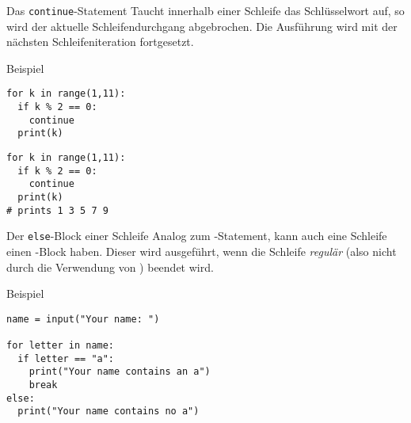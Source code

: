 \begin{fragile}
	

\begin{block}{Das \texttt{continue}-Statement}
Taucht innerhalb einer Schleife das Schlüsselwort  auf, so wird der aktuelle Schleifendurchgang abgebrochen. Die Ausführung wird mit der nächsten Schleifeniteration fortgesetzt. 
\end{block}


\vspace{12pt} \pause 


\begin{exampleblock}{Beispiel}
\vspace{2pt}

\begin{overprint}
\begin{verbatim}
for k in range(1,11):
  if k % 2 == 0:
    continue
  print(k)
\end{verbatim}
\begin{verbatim}
for k in range(1,11):
  if k % 2 == 0:
    continue
  print(k)
# prints 1 3 5 7 9 
\end{verbatim}
\end{overprint}
\end{exampleblock}
	
	
\end{fragile}


\begin{fragile}
	

\begin{block}{Der \texttt{else}-Block einer Schleife}
Analog zum -Statement, kann auch eine Schleife einen -Block haben. Dieser wird ausgeführt, wenn die Schleife \emph{regulär} (also nicht durch die Verwendung von ) beendet wird.  
\end{block}


\vspace{12pt} \pause 


\begin{exampleblock}{Beispiel}
\begin{verbatim}
name = input("Your name: ")

for letter in name: 
  if letter == "a":
    print("Your name contains an a")
    break
else: 
  print("Your name contains no a")
\end{verbatim}
\end{exampleblock}
	
	
\end{fragile}



